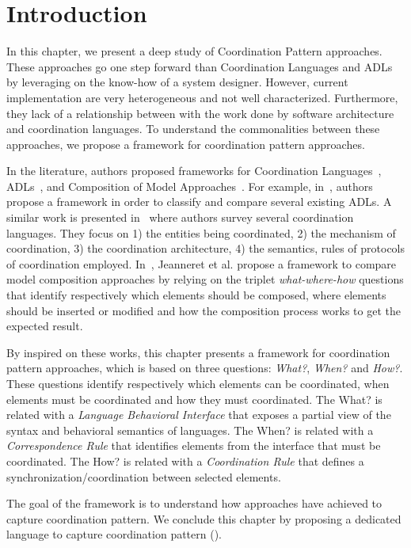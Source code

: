 \section{Introduction}
In this chapter, we present a deep study of Coordination Pattern approaches. These approaches go one step forward than Coordination Languages and ADLs by leveraging on the know-how of a system designer. However, current implementation are very heterogeneous and not well characterized. Furthermore, they lack of a relationship between with the work done by software architecture and coordination languages. To understand the commonalities between these approaches, we propose a framework for coordination pattern approaches. 

In the literature, authors proposed frameworks for Coordination Languages~\cite{coordmodels}, ADLs~\cite{frameadlsbib}, and Composition of Model Approaches~\cite{framecompoas}. For example, in~\cite{frameadlsbib}, authors propose a framework in order to classify and compare several existing ADLs. A similar work is presented in~\cite{coordmodels} where authors survey several coordination languages. They focus on 1) the entities being coordinated, 2) the mechanism of
coordination, 3) the coordination architecture, 4) the semantics, rules of protocols of coordination employed. In~\cite{framecompoas}, Jeanneret et al. propose a framework to compare model
composition approaches by relying on the triplet \emph{what-where-how} questions that identify respectively which elements should be composed, where elements should be inserted or modified and how the composition process works to get the expected result. 

By inspired on these works, this chapter presents a framework for coordination pattern approaches, which is based on three questions: \emph{What?}, \emph{When?} and \emph{How?}. These questions identify respectively which elements can be coordinated, when elements must be coordinated and how they must coordinated. The What? is related with a \emph{Language Behavioral Interface} that exposes a partial view of the syntax and behavioral semantics of languages. The When? is related with a \emph{Correspondence Rule} that identifies elements from the interface that must be coordinated. The How? is related with a \emph{Coordination Rule} that defines a synchronization/coordination between selected elements. 

The goal of the framework is to understand how approaches have achieved to capture coordination pattern. We conclude this chapter by proposing a dedicated language to capture coordination pattern (\bcool).  


